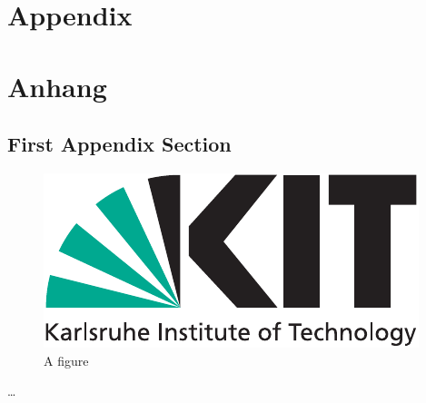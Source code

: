 
{\chapter{Appendix}}    %
{\chapter{Anhang}}      %
\label{chap:appendix}


\section{First Appendix Section}
\label{sec:appendix:FirstSection}
		
\setcounter{figure}{0}
		
\begin{figure} [ht]
  \centering
  \includegraphics[width=.5\linewidth]{logos/kitlogo_en_cmyk}
  \caption{A figure}
  \label{fig:anotherfigure}
\end{figure}


\dots
